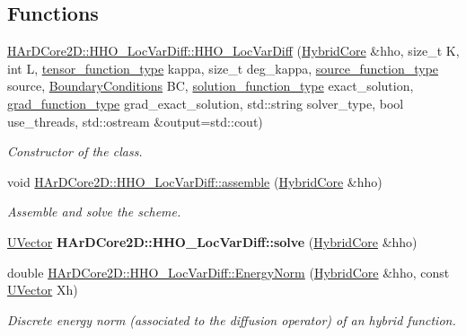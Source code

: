 \subsection*{Functions}
\begin{DoxyCompactItemize}
\item 
\hyperlink{group__HHO__LocVarDiff_ga82ef4509a6352116618e6753b5440e1d}{H\+Ar\+D\+Core2\+D\+::\+H\+H\+O\+\_\+\+Loc\+Var\+Diff\+::\+H\+H\+O\+\_\+\+Loc\+Var\+Diff} (\hyperlink{classHArDCore2D_1_1HybridCore}{Hybrid\+Core} \&hho, size\+\_\+t K, int L, \hyperlink{classHArDCore2D_1_1HHO__LocVarDiff_ab9add9590d4d5b4193799e917c8d746b}{tensor\+\_\+function\+\_\+type} kappa, size\+\_\+t deg\+\_\+kappa, \hyperlink{classHArDCore2D_1_1HHO__LocVarDiff_a5a85ff6ce87c2247d4a4af57b070320d}{source\+\_\+function\+\_\+type} source, \hyperlink{classBoundaryConditions}{Boundary\+Conditions} BC, \hyperlink{classHArDCore2D_1_1HHO__LocVarDiff_ae1c9d7cb11a0b31461d4c19c3b7a7aab}{solution\+\_\+function\+\_\+type} exact\+\_\+solution, \hyperlink{classHArDCore2D_1_1HHO__LocVarDiff_ae0ce0c1a88fe08ddd972cbed5a9e4837}{grad\+\_\+function\+\_\+type} grad\+\_\+exact\+\_\+solution, std\+::string solver\+\_\+type, bool use\+\_\+threads, std\+::ostream \&output=std\+::cout)
\begin{DoxyCompactList}\small\item\em Constructor of the class. \end{DoxyCompactList}\item 
\mbox{\label{group__HHO__LocVarDiff_ga5a556b259e62cf0474e2f933da569b15}} 
void \hyperlink{group__HHO__LocVarDiff_ga5a556b259e62cf0474e2f933da569b15}{H\+Ar\+D\+Core2\+D\+::\+H\+H\+O\+\_\+\+Loc\+Var\+Diff\+::assemble} (\hyperlink{classHArDCore2D_1_1HybridCore}{Hybrid\+Core} \&hho)
\begin{DoxyCompactList}\small\item\em Assemble and solve the scheme. \end{DoxyCompactList}\item 
\mbox{\label{group__HHO__LocVarDiff_gaab5e60d2376c6108e0e7dbcc0dc362eb}} 
\hyperlink{classHArDCore2D_1_1UVector}{U\+Vector} {\bfseries H\+Ar\+D\+Core2\+D\+::\+H\+H\+O\+\_\+\+Loc\+Var\+Diff\+::solve} (\hyperlink{classHArDCore2D_1_1HybridCore}{Hybrid\+Core} \&hho)
\item 
\mbox{\label{group__HHO__LocVarDiff_ga11896824f2d3a743fd7caabeb396f158}} 
double \hyperlink{group__HHO__LocVarDiff_ga11896824f2d3a743fd7caabeb396f158}{H\+Ar\+D\+Core2\+D\+::\+H\+H\+O\+\_\+\+Loc\+Var\+Diff\+::\+Energy\+Norm} (\hyperlink{classHArDCore2D_1_1HybridCore}{Hybrid\+Core} \&hho, const \hyperlink{classHArDCore2D_1_1UVector}{U\+Vector} Xh)
\begin{DoxyCompactList}\small\item\em Discrete energy norm (associated to the diffusion operator) of an hybrid function. \end{DoxyCompactList}\end{DoxyCompactItemize}


